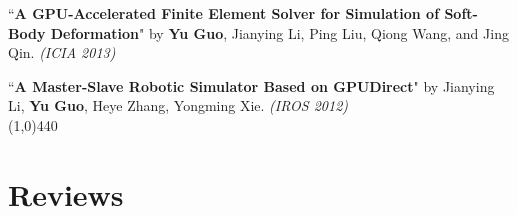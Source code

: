 \documentclass[margin,line]{resume}
\begin{document}
\begin{resume}
	``\textbf{A GPU-Accelerated Finite Element Solver for Simulation of Soft-Body Deformation}" 
	by \textbf{Yu Guo}, Jianying Li, Ping Liu, Qiong Wang, and Jing Qin. 
	\textsl{(ICIA 2013)}\\
	
	\vspace{-5mm}
	
%	
%	
%	
	
	``\textbf{A Master-Slave Robotic Simulator Based on GPUDirect}" 
	by Jianying Li, \textbf{Yu Guo}, Heye Zhang, Yongming Xie.
	\textsl{(IROS 2012)}\\





    \vspace{-5.0mm}
    \line(1,0){440}
    \vspace{-5.0mm}

    \section{\mysidestyle Reviews}


\end{resume}
\end{document}
